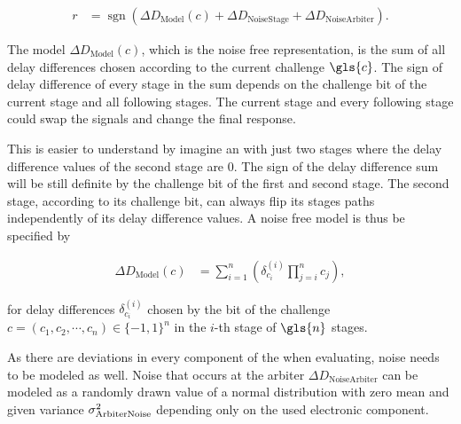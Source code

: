 \begin{align}
r &= \operatorname{sgn}(\Delta D_{\mathrm{Model}}(c) + \Delta D_{\mathrm{Noise Stage}} + \Delta D_{\mathrm{Noise Arbiter}}). \label{equ:pufresponse}
\end{align}

The model $\Delta D_{\mathrm{Model}}(c)$, which is the noise free \apuf representation, is the sum of all delay differences chosen according to the current challenge $\gls{c}$.
The sign of delay difference of every stage in the sum depends on the challenge bit of the current stage and all following stages. %
The current stage and every following stage could swap the signals and change the final response.

This is easier to understand by imagine an \apuf with just two stages where the delay difference values of the second stage are 0. %
The sign of the delay difference sum will be still definite by the challenge bit of the first and second stage.
The second stage, according to its challenge bit, can always flip its stages paths independently of its delay difference values.
A noise free \apuf model is thus be specified by

\begin{align}
\Delta D_{\mathrm{Model}}(c) &= \sum_{i=1}^{n}\left(\delta_{c_{i}}^{(i)}\prod_{j=i}^{n}c_{j}\right), \label{equ:pufmodelc}
\end{align}

for delay differences $\delta_{c_{i}}^{(i)}$ chosen by the bit of the challenge $c = (c_1, c_2, \cdots, c_n) \in \{-1, 1\}^n$ in the $i$-th stage of $\gls{n}$ stages.

As there are deviations in every component of the \puf when evaluating, noise needs to be modeled as well.
Noise that occurs at the arbiter $\Delta D_{\mathrm{Noise Arbiter}}$ can be modeled as a randomly drawn value of a normal distribution with zero mean and given variance $\sigma_{\mathrm{Arbiter Noise}}^2$ depending only on the used electronic component. %

